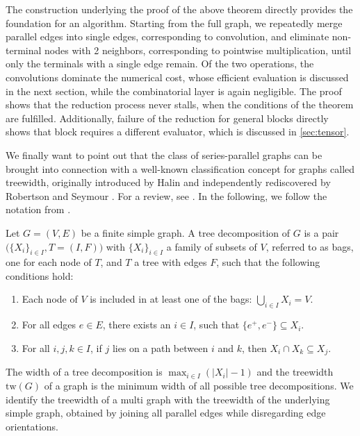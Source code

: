\documentclass[]{amsart}
\numberwithin{mythm}{section}
\begin{document}
The construction underlying the proof of the above theorem directly provides the foundation for an algorithm. Starting from the full graph, we repeatedly merge parallel edges into single edges, corresponding to convolution, and eliminate non-terminal nodes with 2 neighbors, corresponding to pointwise multiplication, until only the terminals with a single edge remain. Of the two operations, the convolutions dominate the numerical cost, whose efficient evaluation is discussed in the next section, while the combinatorial layer is again negligible. The proof shows that the reduction process never stalls, when the conditions of the theorem are fulfilled. Additionally, failure of the reduction for general blocks directly shows that block requires a different evaluator, which is discussed in \cref{sec:tensor}.

We finally want to point out that the class of series-parallel graphs can be brought into connection with a well-known classification concept for graphs called treewidth, originally introduced by Halin \cite{halin1976s} and independently rediscovered by Robertson and
Seymour \cite{RobertsonSeymour1986}. For a review, see \cite{CyganFKLMPPS15}. In the following, we follow the notation from \cite{Bodlaender1998}. 

\begin{definition}
    \label{def:tree_decomp}
Let $G=(V,E)$ be a finite simple graph. A tree decomposition of $G$ is a pair $\big(\{X_i\}_{i \in I}, T=(I,F)\big)$ with $\{X_i\}_{i\in I}$ a family of subsets of $V$, referred to as bags, one for each node of $T$, and $T$ a tree with edges $F$, such that the following conditions hold:
\begin{enumerate}
    \item Each node of $V$ is included in at least one of the bags: $\bigcup_{i\in I}X_i=V$.
    \item For all edges $e\in E$, there exists an $i\in I$, such that $\{e^+, e^-\}\subseteq X_i$.
    \item For all $i,j,k\in I$, if $j$ lies on a path between $i$ and $k$, then $X_i\cap X_k\subseteq X_j$.
\end{enumerate}
The width of a tree decomposition is $\max_{i\in I}(|X_i|-1)$ and the treewidth $\mathrm{tw}(G)$ of a graph is the minimum width of all possible tree decompositions. We identify the treewidth of a multi graph with the treewidth of the underlying simple graph, obtained by joining all parallel edges while disregarding edge orientations.
\end{definition}
\end{document}
